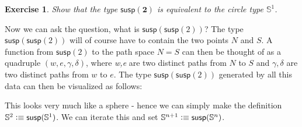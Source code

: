\documentclass[11pt]{article}
\newcommand{\two}{\mathbf{2}}
\newcommand{\Sphere}[1]{\mathbb{S}^#1}
\newcommand{\susp}{\ensuremath{\mathsf{susp}}\xspace}
\newtheorem*{exercise}{Exercise}
\begin{document}
\begin{exercise}
Show that the type $\susp(\two)$ is equivalent to the circle type $\Sphere{1}$.
\end{exercise}

Now we can ask the question, what is $\susp(\susp(2))$? The type $\susp(\susp(2))$ will of course have to contain the two points $N$ and $S$. A function from $\susp(2)$ to the path space $N = S$ can then be thought of as a quadruple $(w, e, \gamma, \delta)$, where \emph{w,e} are two distinct paths from $N$ to $S$ and $\gamma,\delta$ are two distinct paths from $w$ to $e$. The type $\susp(\susp(2))$ generated by all this data can then be visualized as follows:

This looks very much like a sphere - hence we can simply make the definition $\Sphere{2} \defeq \susp(\Sphere{1})$. We can iterate this and set $\Sphere{{n+1}} \defeq \susp(\Sphere{n})$.
\end{document}

